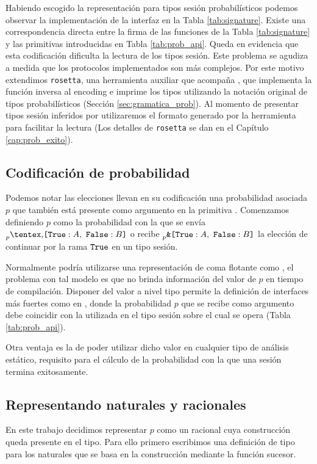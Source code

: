 Habiendo escogido la representación para tipos sesión probabilísticos podemos
observar la implementación de la interfaz \OCaml en la Tabla
\ref{tab:signature}. Existe una correspondencia directa entre la firma de las
funciones de la Tabla \ref{tab:signature} y las primitivas introducidas en
Tabla \ref{tab:prob_api}. Queda en evidencia que esta codificación dificulta
la lectura de los tipos sesión. Este problema se agudiza a medida que los
protocolos implementados son más complejos. Por este motivo extendimos
\texttt{rosetta}, una herramienta auxiliar que acompaña \FuSe, que implementa
la función inversa al encoding e imprime los tipos utilizando la notación
original de tipos probabilísticos (Sección \ref{sec:gramatica_prob}). Al
momento de presentar tipos sesión inferidos por \OCaml utilizaremos el formato
generado por la herramienta para facilitar la lectura (Los detalles de
\texttt{rosetta} se dan en el Capítulo \ref{cap:prob_exito}).

\subsection{Codificación de probabilidad}

Podemos notar las elecciones llevan en su codificación una probabilidad
asociada $p$ que también está presente como argumento en la primitiva
. Comenzamos definiendo $p$ como la probabilidad con la que se envía
$\BinaryPChoice{\etvar}{\etvarB}$ o recibe $\BinaryPBranch{\etvar}{\etvarB}$
la elección de continuar por la rama $\Tag[True]$ en un tipo sesión.

Normalmente podría utilizarse una representación de coma flotante como \tfloat,
el problema con tal modelo es que no brinda información del valor de $p$ en
tiempo de compilación. Disponer del valor a nivel tipo permite la definición de
interfaces más fuertes como en , donde la probabilidad $p$ que se
recibe como argumento debe coincidir con la utilizada en el tipo sesión sobre
el cual se opera (Tabla \ref{tab:prob_api}).

Otra ventaja es la de poder utilizar dicho valor en cualquier tipo de análisis
estático, requisito para el cálculo de la probabilidad con la que una sesión
termina exitosamente.

\subsection{Representando naturales y racionales}

En este trabajo decidimos representar $p$ como un racional cuya construcción
queda presente en el tipo. Para ello primero escribimos una definición de tipo
para los naturales que se basa en la construcción mediante la función sucesor.

